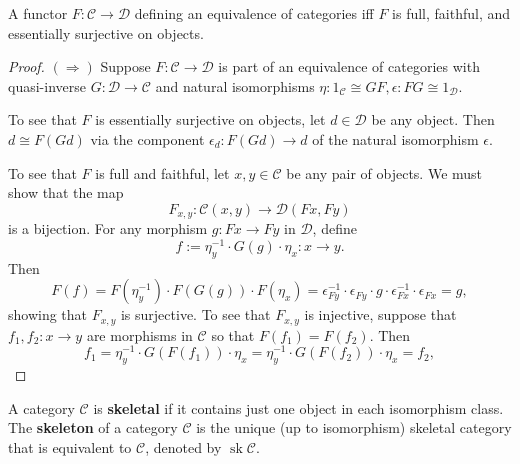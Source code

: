 \documentclass[12pt, oneside]{book}
\begin{document}
\begin{theorem}
    A functor $F: \mathcal{C} \rightarrow \mathcal{D}$ defining an equivalence of categories iff $F$ is full, faithful, and essentially surjective on objects.
    \begin{proof}
        $(\Rightarrow)$
        Suppose $F: \mathcal{C} \rightarrow \mathcal{D}$ is part of an equivalence of categories with quasi-inverse $G: \mathcal{D} \rightarrow \mathcal{C}$ and natural isomorphisms $\eta: 1_{\mathcal{C}} \cong G F, \epsilon: F G \cong 1_{\mathcal{D}}$.

        To see that $F$ is essentially surjective on objects, let $d \in \mathcal{D}$ be any object.
        Then $d \cong F(G d)$ via the component $\epsilon_d: F(G d) \rightarrow d$ of the natural isomorphism $\epsilon$.

        To see that $F$ is full and faithful, let $x, y \in \mathcal{C}$ be any pair of objects.
        We must show that the map
        \begin{equation*}
            F_{x, y}: \mathcal{C}(x, y) \rightarrow \mathcal{D}(F x, F y)
        \end{equation*}
        is a bijection.
        For any morphism $g: F x \rightarrow F y$ in $\mathcal{D}$, define
        \begin{equation*}
            f:=\eta_y^{-1} \cdot G(g) \cdot \eta_x: x \rightarrow y .
        \end{equation*}
        Then
        \begin{equation*}
            F(f)=F\left(\eta_y^{-1}\right) \cdot F(G(g)) \cdot F\left(\eta_x\right)=\epsilon_{F y}^{-1} \cdot \epsilon_{F y} \cdot g \cdot \epsilon_{F x}^{-1} \cdot \epsilon_{F x}=g,
        \end{equation*}
        showing that $F_{x, y}$ is surjective.
        To see that $F_{x, y}$ is injective, suppose that $f_1, f_2: x \rightarrow y$ are morphisms in $\mathcal{C}$ so that $F\left(f_1\right)=F\left(f_2\right)$. Then
        \begin{equation*}
            f_1=\eta_y^{-1} \cdot G\left(F\left(f_1\right)\right) \cdot \eta_x=\eta_y^{-1} \cdot G\left(F\left(f_2\right)\right) \cdot \eta_x=f_2,
        \end{equation*}
    \end{proof}
\end{theorem}




\begin{definition}
    A category $\mathcal{C}$ is \textbf{skeletal} if it contains just one object in each isomorphism class.
    The \textbf{skeleton} of a category $\mathcal{C}$ is the unique (up to isomorphism) skeletal category that is equivalent to $\mathcal{C}$, denoted by $\operatorname{sk}\mathcal{C}$.
\end{definition}
\end{document}
